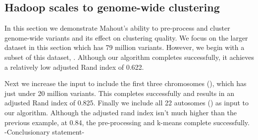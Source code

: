 \documentclass{bioinfo}
\begin{document}





\subsection*{Hadoop scales to genome-wide clustering}
In this section we demonstrate Mahout's ability to pre-process and cluster genome-wide variants and its effect on clustering quality.
We focus on the larger \FullPhasethree{} dataset in this section which has 79 million variants.
However, we begin with a subset of this dataset, \OnePhasethree{}. Although our algorithm completes successfully, it achieves a relatively low adjusted Rand index of 0.622.

Next we increase the input to include the first three chromosomes (\ThreePhasethree{}), which has just under 20 million variants. This completes successfully and results in an adjusted Rand index of 0.825.
Finally we include all 22 autosomes (\FullPhasethree{}) as input to our algorithm. Although the adjusted rand index isn't much higher than the previous example, at 0.84, the pre-processing and k-means complete successfully.
-Conclusionary statement- 

\end{document}
